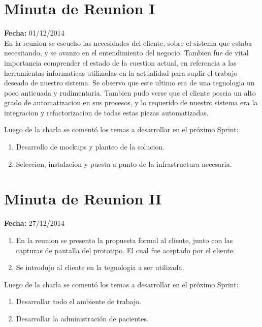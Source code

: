 \documentclass[runningheads,a4paper,spanish]{llncs}
\begin{document}
\appendix
\appendixpage
\section{Minuta de Reunion I}

\textbf{Fecha: }01/12/2014\\

	En la reunion se escucho las necesidades del cliente, sobre el sistema que estaba necesitando, y se avanzo en el entendimiento del negocio. Tambien fue de vital importancia comprender el estado de la cuestion actual, en referencia a las herramientas informaticas utilizadas en la actualidad para suplir el trabajo deseado de nuestro sistema. Se observo que este ultimo era de una tegnologia un poco anticuada y rudimentaria. Tambien pudo verse que el cliente poseia un alto grado de automatizacion en sus procesos, y lo requerido de nuestro sistema era la integracion y refactorizacion de todas estas piezas automatizadas.

Luego de la charla se comentó los temas a desarrollar en el próximo Sprint:
\begin{enumerate}
	\item Desarrollo de mockups y planteo de la solucion.
	\item Seleccion, instalacion y puesta a punto de la infrastructura necesaria. 
\end{enumerate}

\section{Minuta de Reunion II}

\textbf{Fecha: }27/12/2014\\

\begin{enumerate}
\item En la reunion se presento la propuesta formal al cliente, junto con las capturas de pantalla del prototipo. El cual fue aceptado por el cliente.
\item Se introdujo al cliente en la tegnologia a ser utilizada.
\end{enumerate}

\begin{flushleft}
Luego de la charla se comentó los temas a desarrollar en el próximo Sprint:
\end{flushleft}

\begin{enumerate}
	\item Desarrollar todo el ambiente de trabajo.
	\item Desarrollar la administración de pacientes. 
\end{enumerate}
\end{document}
